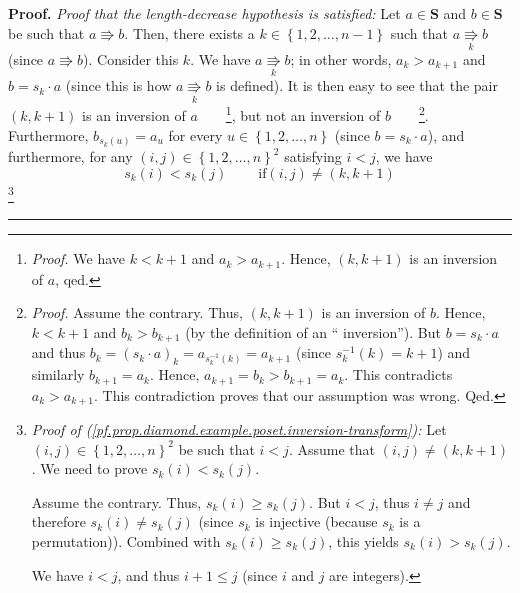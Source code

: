 \documentclass[numbers=enddot,12pt,final,onecolumn,notitlepage]{scrartcl}%
\theoremstyle{definition}
\newenvironment{proof}[1][Proof]{\noindent\textbf{#1.} }{\ \rule{0.5em}{0.5em}}
\newenvironment{verlong}{}{}
\begin{document}
\begin{proof}
\begin{verlong}
\textit{Proof that the length-decrease hypothesis is satisfied:} Let
$a\in\mathbf{S}$ and $b\in\mathbf{S}$ be such that $a\Rrightarrow b$. Then,
there exists a $k\in\left\{  1,2,\ldots,n-1\right\}  $ such that
$a\underset{k}{\Rrightarrow}b$ (since $a\Rrightarrow b$). Consider this $k$.
We have $a\underset{k}{\Rrightarrow}b$; in other words, $a_{k}>a_{k+1}$ and
$b=s_{k}\cdot a$ (since this is how $a\underset{k}{\Rrightarrow}b$ is
defined). It is then easy to see that the pair $\left(  k,k+1\right)  $ is an
inversion of $a$\ \ \ \ \footnote{\textit{Proof.} We have $k<k+1$ and
$a_{k}>a_{k+1}$. Hence, $\left(  k,k+1\right)  $ is an inversion of $a$,
qed.}, but not an inversion of $b$\ \ \ \ \footnote{\textit{Proof.} Assume the
contrary. Thus, $\left(  k,k+1\right)  $ is an inversion of $b$. Hence,
$k<k+1$ and $b_{k}>b_{k+1}$ (by the definition of an \textquotedblleft
inversion\textquotedblright). But $b=s_{k}\cdot a$ and thus $b_{k}=\left(
s_{k}\cdot a\right)  _{k}=a_{s_{k}^{-1}\left(  k\right)  }=a_{k+1}$ (since
$s_{k}^{-1}\left(  k\right)  =k+1$) and similarly $b_{k+1}=a_{k}$. Hence,
$a_{k+1}=b_{k}>b_{k+1}=a_{k}$. This contradicts $a_{k}>a_{k+1}$. This
contradiction proves that our assumption was wrong. Qed.}. Furthermore,
$b_{s_{k}\left(  u\right)  }=a_{u}$ for every $u\in\left\{  1,2,\ldots
,n\right\}  $ (since $b=s_{k}\cdot a$), and furthermore, for any $\left(
i,j\right)  \in\left\{  1,2,\ldots,n\right\}  ^{2}$ satisfying $i<j$, we have%
\begin{equation}
s_{k}\left(  i\right)  <s_{k}\left(  j\right)  \ \ \ \ \ \ \ \ \ \ \text{if
}\left(  i,j\right)  \neq\left(  k,k+1\right)
\label{pf.prop.diamond.example.poset.inversion-transform}%
\end{equation}
\footnote{\textit{Proof of
(\ref{pf.prop.diamond.example.poset.inversion-transform}):} Let $\left(
i,j\right)  \in\left\{  1,2,\ldots,n\right\}  ^{2}$ be such that $i<j$. Assume
that $\left(  i,j\right)  \neq\left(  k,k+1\right)  $. We need to prove
$s_{k}\left(  i\right)  <s_{k}\left(  j\right)  $.
\par
Assume the contrary. Thus, $s_{k}\left(  i\right)  \geq s_{k}\left(  j\right)
$. But $i<j$, thus $i\neq j$ and therefore $s_{k}\left(  i\right)  \neq
s_{k}\left(  j\right)  $ (since $s_{k}$ is injective (because $s_{k}$ is a
permutation)). Combined with $s_{k}\left(  i\right)  \geq s_{k}\left(
j\right)  $, this yields $s_{k}\left(  i\right)  >s_{k}\left(  j\right)  $.
\par
We have $i<j$, and thus $i+1\leq j$ (since $i$ and $j$ are integers).
}
\end{verlong}
\end{proof}
\end{document}
